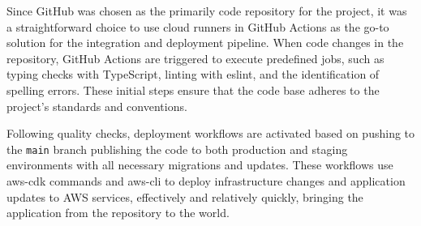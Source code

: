 Since GitHub was chosen as the primarily code repository for the project, it was a straightforward choice to use cloud runners in GitHub Actions as the go-to solution for the integration and deployment pipeline.
When code changes in the repository, GitHub Actions are triggered to execute predefined jobs, such as typing checks with TypeScript, linting with \gls{eslint}, and the identification of spelling errors.
These initial steps ensure that the code base adheres to the project's standards and conventions.

Following quality checks, deployment workflows are activated based on pushing to the \texttt{main} branch publishing the code to both production and staging environments with all necessary migrations and updates.
These workflows use \gls{aws-cdk} commands and \gls{aws-cli} to deploy infrastructure changes and application updates to \ac{AWS} services, effectively and relatively quickly, bringing the application from the repository to the world.


